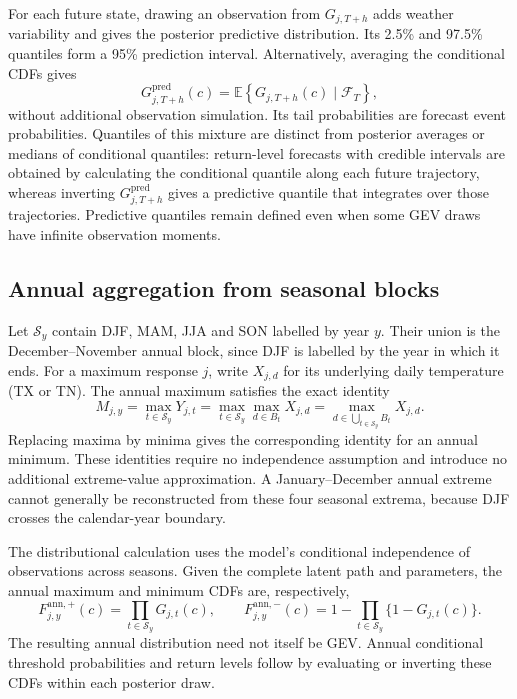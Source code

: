 \documentclass[11pt,a4paper]{article}
\newcommand{\E}{\mathbb E}
\begin{document}
	For each future state, drawing an observation from \(G_{j,T+h}\)
	adds weather variability and gives the posterior predictive
	distribution. Its 2.5\% and 97.5\% quantiles form a 95\% prediction
	interval. Alternatively, averaging the conditional CDFs gives
	\begin{equation}\label{eq:predictive-cdf}
		G^{\mathrm{pred}}_{j,T+h}(c)
		=\E\!\left\{G_{j,T+h}(c)\mid\mathcal F_T\right\},
	\end{equation}
	without additional observation simulation. Its tail probabilities
	are forecast event probabilities. Quantiles of this mixture are
	distinct from posterior averages or medians of conditional quantiles:
	return-level forecasts with credible intervals are obtained by
	calculating the conditional quantile along each future trajectory,
	whereas inverting \(G^{\mathrm{pred}}_{j,T+h}\) gives a predictive
	quantile that integrates over those trajectories. Predictive
	quantiles remain defined even when some GEV draws have infinite
	observation moments.
	
	\subsection{Annual aggregation from seasonal blocks}
	\label{supp:annual-aggregation}
	
	Let \(\mathcal S_y\) contain DJF, MAM, JJA and SON labelled by year
	\(y\). Their union is the December--November annual block, since DJF
	is labelled by the year in which it ends. For a maximum response
	\(j\), write \(X_{j,d}\) for its underlying daily temperature
	(TX or TN). The annual maximum satisfies the exact identity
	\begin{equation}\label{eq:supp-annual-identity}
		M_{j,y}
		=\max_{t\in\mathcal S_y}Y_{j,t}
		=\max_{t\in\mathcal S_y}\max_{d\in B_t}X_{j,d}
		=\max_{d\in\bigcup_{t\in\mathcal S_y}B_t}X_{j,d}.
	\end{equation}
	Replacing maxima by minima gives the corresponding identity for an
	annual minimum. These identities require no independence assumption
	and introduce no additional extreme-value approximation. A
	January--December annual extreme cannot generally be reconstructed
	from these four seasonal extrema, because DJF crosses the
	calendar-year boundary.
	
	The distributional calculation uses the model's conditional
	independence of observations across seasons. Given the complete
	latent path and parameters, the annual maximum and minimum CDFs are,
	respectively,
	\begin{equation}\label{eq:annual-seasonal-cdf}
		F^{\mathrm{ann},+}_{j,y}(c)
		=\prod_{t\in\mathcal S_y}G_{j,t}(c),
		\qquad
		F^{\mathrm{ann},-}_{j,y}(c)
		=1-\prod_{t\in\mathcal S_y}\{1-G_{j,t}(c)\}.
	\end{equation}
	The resulting annual distribution need not itself be GEV. Annual
	conditional threshold probabilities and return levels follow by
	evaluating or inverting these CDFs within each posterior draw.
	
\end{document}
